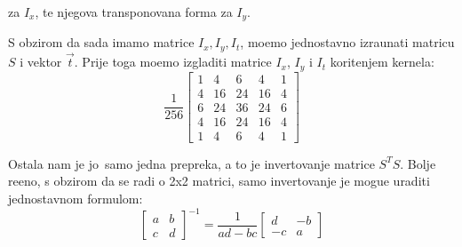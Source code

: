 za $I_x$, te njegova transponovana forma za $I_y$.

S obzirom da sada imamo matrice $I_x,I_y,I_t$, mo\zh emo jednostavno izra\ch unati matricu $S$ i vektor $\vec{t}$. Prije toga mo\zh emo izgladiti matrice $I_x$, $I_y$ i $I_t$ kori\sh tenjem kernela:
\[
\frac{1}{256}
\begin{bmatrix}
1 & 4 & 6 & 4 & 1 \\
4 & 16 & 24 & 16 & 4 \\
6 & 24 & 36 & 24 & 6 \\
4 & 16 & 24 & 16 & 4 \\
1 & 4 & 6 & 4 & 1
\end{bmatrix}
\]

Ostala nam je jo\sh\ samo jedna prepreka, a to je invertovanje matrice $S^TS$. Bolje re\ch eno, s obzirom da se radi o 2x2 matrici, samo invertovanje je mogu\cj e uraditi jednostavnom formulom:
\[
\begin{bmatrix}
a & b \\
c & d
\end{bmatrix}^{-1}
=\frac{1}{ad-bc}
\begin{bmatrix}
d & -b \\
-c & a
\end{bmatrix}
\]


